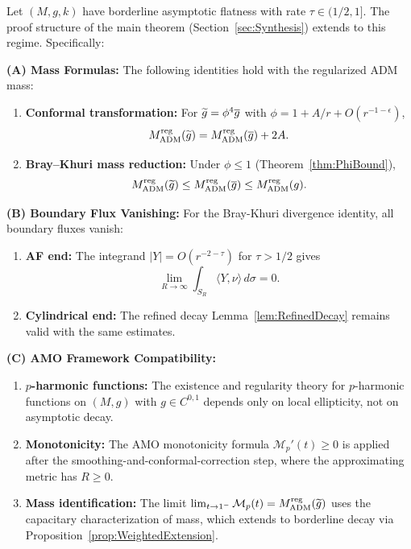 \begin{theorem}
\label{thm:BorderlineCompatibility}
Let $(M, g, k)$ have borderline asymptotic flatness with rate $\tau \in (1/2, 1]$. The proof structure of the main theorem (Section~\ref{sec:Synthesis}) extends to this regime. Specifically:

\textbf{(A) Mass Formulas:} The following identities hold with the regularized ADM mass:
\begin{enumerate}
    \item \textbf{Conformal transformation:} For $\widetilde{g} = \phi^4 \overline{g}$ with $\phi = 1 + A/r + O(r^{-1-\epsilon})$,
    \begin{equation}
        M_{\mathrm{ADM}}^{\mathrm{reg}}(\widetilde{g}) = M_{\mathrm{ADM}}^{\mathrm{reg}}(\overline{g}) + 2A.
    \end{equation}
    \item \textbf{Bray--Khuri mass reduction:} Under $\phi \le 1$ (Theorem~\ref{thm:PhiBound}),
    \begin{equation}
        M_{\mathrm{ADM}}^{\mathrm{reg}}(\widetilde{g}) \le M_{\mathrm{ADM}}^{\mathrm{reg}}(\overline{g}) \le M_{\mathrm{ADM}}^{\mathrm{reg}}(g).
    \end{equation}
\end{enumerate}

\textbf{(B) Boundary Flux Vanishing:} For the Bray-Khuri divergence identity, all boundary fluxes vanish:
\begin{enumerate}
    \item \textbf{AF end:} The integrand $|Y| = O(r^{-2-\tau})$ for $\tau > 1/2$ gives
    \begin{equation}
        \lim_{R \to \infty} \int_{S_R} \langle Y, \nu \rangle \, d\sigma = 0.
    \end{equation}
    \item \textbf{Cylindrical end:} The refined decay Lemma~\ref{lem:RefinedDecay} remains valid with the same estimates.
\end{enumerate}

\textbf{(C) AMO Framework Compatibility:}
\begin{enumerate}
    \item \textbf{$p$-harmonic functions:} The existence and regularity theory for $p$-harmonic functions on $(M, g)$ with $g \in C^{0,1}$ depends only on local ellipticity, not on asymptotic decay.
    \item \textbf{Monotonicity:} The AMO monotonicity formula $\mathcal{M}_p'(t) \ge 0$ is applied after the smoothing-and-conformal-correction step, where the approximating metric has $R\ge0$.
    \item \textbf{Mass identification:} The limit $\lim_{t \to 1^-} \mathcal{M}_p(t) = M_{\mathrm{ADM}}^{\mathrm{reg}}(\widetilde{g})$ uses the capacitary characterization of mass, which extends to borderline decay via Proposition~\ref{prop:WeightedExtension}.
\end{enumerate}


\end{theorem}
